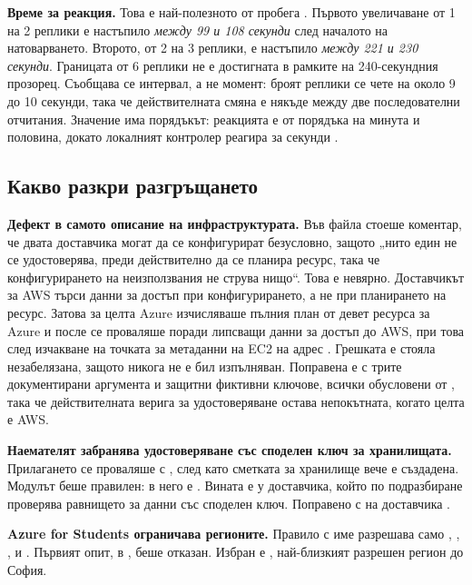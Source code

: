 \textbf{Време за реакция.} Това е най-полезното от пробега . Първото
увеличаване от 1 на 2 реплики е настъпило \emph{между 99 и 108 секунди} след началото на
натоварването. Второто, от 2 на 3 реплики, е настъпило \emph{между 221 и 230 секунди}. Границата
 от 6 реплики не е достигната в рамките на 240-секундния прозорец. Съобщава се
интервал, а не момент: броят реплики се чете на около 9 до 10 секунди, така че действителната смяна
е някъде между две последователни отчитания. Значение има порядъкът: реакцията е от порядъка на
минута и половина, докато локалният контролер реагира за секунди .

\subsection{Какво разкри разгръщането}

\textbf{Дефект в самото описание на инфраструктурата.} Във файла  стоеше
коментар, че двата доставчика могат да се конфигурират безусловно, защото „нито един не се
удостоверява, преди действително да се планира ресурс, така че конфигурирането на неизползвания не
струва нищо“. Това е невярно. Доставчикът за AWS търси данни за достъп при
конфигурирането, а не при планирането на ресурс. Затова  за целта Azure изчисляваше пълния
план от девет ресурса за Azure и после се проваляше поради липсващи данни за достъп до AWS, при
това след изчакване на точката за метаданни на EC2 на адрес . Грешката е
стояла незабелязана, защото  никога не е бил изпълняван. Поправена е с трите документирани аргумента  и защитни фиктивни ключове,
всички обусловени от , така че действителната верига за удостоверяване
остава непокътната, когато целта е AWS.

\textbf{Наемателят забранява удостоверяване със споделен ключ за хранилищата.} Прилагането се
проваляше с , след като сметката за хранилище вече е
създадена. Модулът беше правилен: в него  е . Вината е у доставчика, който по
подразбиране проверява равнището за данни със споделен ключ. Поправено с  на доставчика .

\textbf{Azure for Students ограничава регионите.} Правило с име 
разрешава само , , ,
 и . Първият опит, в , беше отказан.
Избран е , най-близкият разрешен регион до София.

